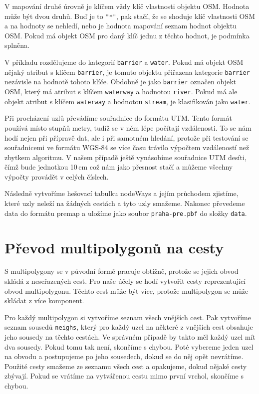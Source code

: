 V mapování druhé úrovně je klíčem vždy klíč vlastnosti objektu OSM. Hodnota může
být dvou druhů. Buď je to \verb|"*"|, pak stačí, že se shoduje klíč vlastnosti
OSM a na hodnoty se nehledí, nebo je hodnota mapování seznam hodnot objektu OSM.
Pokud má objekt OSM pro daný klíč jednu z těchto hodnot, je  podmínka splněna. 

V příkladu rozdělujeme do kategorií \verb|barrier| a \verb|water|. Pokud má
objekt OSM nějaký atribut s klíčem \verb|barrier|, je tomuto objektu přiřazena
kategorie \verb|barrier| nezávisle na hodnotě tohoto klíče. Obdobně je jako
\verb|barrier| označen objekt OSM, který má atribut s klíčem \verb|waterway| a
hodnotou \verb|river|. Pokud má ale objekt atribut s klíčem \verb|waterway| a
hodnotou \verb|stream|, je klasifikován jako \verb|water|.

Při procházení uzlů převádíme souřadnice do formátu UTM\cite{utmnorma}. Tento
formát používá místo stupňů metry, tudíž se v něm lépe počítají vzdálenosti. To
se nám hodí nejen při přípravě dat, ale i při samotném hledání, protože při
testování se souřadnicemi ve formátu WGS-84 se více času trávilo výpočtem
vzdáleností než zbytkem algoritmu. V našem případě ještě {\tuc vynásobíme souřadnice
UTM desíti}, čímž bude jednotkou 10\,cm což nám jako přesnost stačí a můžeme
všechny výpočty provádět v celých číslech.

Následně vytvoříme hešovací tabulku nodeWays a jejím průchodem zjistíme, které
uzly neleží na žádných cestách a tyto uzly smažeme. Nakonec převedeme data do
formátu premap a uložíme jako soubor \verb|praha-pre.pbf| do složky \verb|data|.

\section{Převod multipolygonů na cesty}
S multipolygony se v původní formě pracuje obtížně, protože se jejich obvod
skládá z neseřazených cest. Pro naše účely se hodí vytvořit cesty reprezentující
obvod multipolygonu. Těchto cest může být více, protože multipolygon se může
skládat z více komponent. 

Pro každý multipolygon si vytvoříme seznam všech vnějších cest. Pak vytvoříme
seznam sousedů \verb|neighs|, který pro každý uzel na některé z vnějších cest
obsahuje jeho sousedy na těchto cestách. Ve správném případě by takto měl každý
uzel mít dva sousedy. Pokud tomu tak není, skončíme s chybou. Poté vybereme
jeden uzel na obvodu a postupujeme po jeho sousedech, dokud se do něj opět
nevrátíme. Použité cesty smažeme ze seznamu všech cest a opakujeme, dokud nějaké
cesty zbývají. Pokud se vrátíme na vytvářenou cestu mimo první vrchol, skončíme
s chybou.

